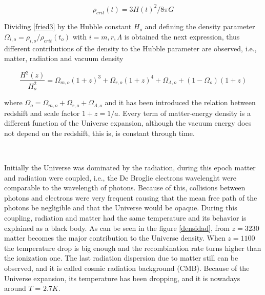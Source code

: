 \[\rho_{crit}(t)= 3H(t)^2/8\pi G\]

Dividing \ref{fried3} by the Hubble constant $H_o$ and defining 
the density parameter  $\Omega_{i,o} = \rho_{i,o}/\rho_{crit}(t_o)$ 
with $i=m,r,\Lambda$ is obtained the next expression, thus different 
contributions of the density to the Hubble parameter are observed, i.e., 
matter, radiation and vacuum density

\begin{equation}
\frac{H^2(z)}{H_o^{2}}=\Omega_{m,o}\left(1+z\right)^3+
\Omega_{r,o}\left(1+z\right)^4+ \Omega_{\Lambda,o} + ( 1-\Omega_o)
\left(1+z\right)
\label{fried4}
\end{equation}


where $\Omega_o=\Omega_{m,o} +\Omega_{r,o}+\Omega_{\Lambda,o}$ and
it has been introduced the relation between redshift and scale
factor $1+z=1/a$. Every term of matter-energy density 
is a different function of the Universe expansion, although the vacuum 
energy does not depend on the redshift, this is, is constant through time.

\

Initially the Universe was dominated by the radiation, during 
this epoch matter and radiation were coupled, i.e., the De Broglie 
electrons wavelenght were comparable to the wavelength of photons. Because
of this, collisions between photons and electrons were very frequent causing
that the mean free path of the photons be negligible and that the Universe 
would be opaque. 
During this coupling, radiation and matter had the same temperature
and its behavior is explained as a black body. 
As can be seen in the figure \ref{densidad}, from $z=3230$
matter becomes the major contribution to the Universe density.
When $z=1100$ the temperature drop is big enough and the
recombination rate turns higher than the ionization one. 
The last radiation dispersion due to matter still can be
observed, and it is called cosmic radiation background (CMB).
Because of the Universe expansion, its temperature
has been dropping, and it is nowadays around $T$ = $2.7K$. 
  
